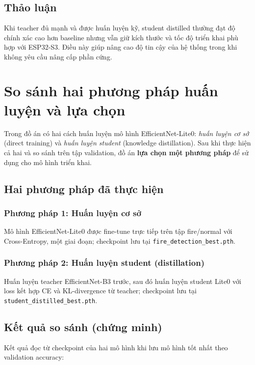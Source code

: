 \documentclass[12pt,a4paper]{report}
\begin{document}
\subsection{Thảo luận}

Khi teacher đủ mạnh và được huấn luyện kỹ, student distilled thường đạt độ chính xác cao hơn baseline nhưng vẫn giữ kích thước và tốc độ triển khai phù hợp với ESP32-S3. Điều này giúp nâng cao độ tin cậy của hệ thống trong khi không yêu cầu nâng cấp phần cứng.

\section{So sánh hai phương pháp huấn luyện và lựa chọn}

Trong đồ án có hai cách huấn luyện mô hình EfficientNet-Lite0: \emph{huấn luyện cơ sở} (direct training) và \emph{huấn luyện student} (knowledge distillation). Sau khi thực hiện cả hai và so sánh trên tập validation, đồ án \textbf{lựa chọn một phương pháp} để sử dụng cho mô hình triển khai.

\subsection{Hai phương pháp đã thực hiện}

\subsubsection{Phương pháp 1: Huấn luyện cơ sở}

Mô hình EfficientNet-Lite0 được fine-tune trực tiếp trên tập fire/normal với Cross-Entropy, một giai đoạn; checkpoint lưu tại \texttt{fire\_detection\_best.pth}.

\subsubsection{Phương pháp 2: Huấn luyện student (distillation)}

Huấn luyện teacher EfficientNet-B3 trước, sau đó huấn luyện student Lite0 với loss kết hợp CE và KL-divergence từ teacher; checkpoint lưu tại \texttt{student\_distilled\_best.pth}.

\subsection{Kết quả so sánh (chứng minh)}

Kết quả đọc từ checkpoint của hai mô hình khi lưu mô hình tốt nhất theo validation accuracy:
\end{document}
